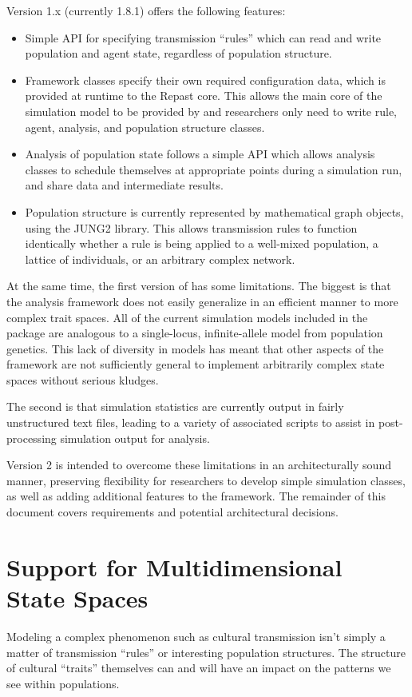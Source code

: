 \documentclass[pdftex,letterpaper,rmp,groupedaddress,floatfix]{revtex4}
\begin{document}
\tl Version 1.x (currently 1.8.1) offers the following features:
\begin{itemize}
\item Simple API for specifying transmission ``rules'' which can read and write population and agent state, regardless of population structure.
\item Framework classes specify their own required configuration data, which is provided at runtime to the Repast core.  This allows the main core of the simulation model to be provided by \tl and researchers only need to write rule, agent, analysis, and population structure classes.
\item Analysis of population state follows a simple API which allows analysis classes to schedule themselves at appropriate points during a simulation run, and share data and intermediate results.  
\item Population structure is currently represented by mathematical graph objects, using the JUNG2 library.  This allows transmission rules to function identically whether a rule is being applied to a well-mixed population, a lattice of individuals, or an arbitrary complex network.  
\end{itemize}
At the same time, the first version of \tl has some limitations.  The biggest is that the analysis framework does not easily generalize in an efficient manner to more complex trait spaces.  All of the current simulation models included in the \tl package are analogous to a single-locus, infinite-allele model from population genetics.  This lack of diversity in models has meant that other aspects of the framework are not sufficiently general to implement arbitrarily complex state spaces without serious kludges.  

The second is that simulation statistics are currently output in fairly unstructured text files, leading to a variety of associated scripts to assist in post-processing simulation output for analysis.  

\tl Version 2 is intended to overcome these limitations in an architecturally sound manner, preserving flexibility for researchers to develop simple simulation classes, as well as adding additional features to the framework.  The remainder of this document covers requirements and potential architectural decisions.  

\section{Support for Multidimensional State Spaces}
Modeling a complex phenomenon such as cultural transmission isn't simply a matter of transmission ``rules'' or interesting population structures.  The structure of cultural ``traits'' themselves can and will have an impact on the patterns we see within populations.  
\end{document}
